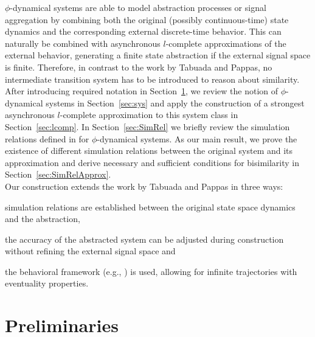 \documentclass[letterpaper, 11 pt, onecolumn]{ieeeconf}
\newcommand{\0}{\ensuremath{\emptyset}}
\newcommand{\signalmap}{\phi}
\begin{document}
$\signalmap$-dynamical systems are able to model abstraction processes or signal aggregation by combining both the original (possibly continuous-time) state dynamics and the corresponding external discrete-time behavior. This can naturally be combined with asynchronous $l$-complete approximations of the external behavior, generating a finite state abstraction if the external signal space is finite. Therefore, in contrast to the work by Tabuada and Pappas, no intermediate transition system has to be introduced to reason about similarity.\\
After introducing required notation in Section~\ref{sec:prelim}, we review the notion of $\signalmap$-dynamical systems in Section~\ref{sec:sys} and apply the construction of a strongest asynchronous $l$-complete approximation to this system class in Section~\ref{sec:lcomp}. In Section~\ref{sec:SimRel} we briefly review the simulation relations defined in \cite{SchmuckRaisch2014_HSCC} for $\signalmap$-dynamical systems. As our main result, we prove the existence of different simulation relations between the original system and its approximation and derive necessary and sufficient conditions for bisimilarity in Section~\ref{sec:SimRelApprox}.\\
Our construction extends the work by Tabuada and Pappas in three ways:
\begin{inparaenum}[(i)]
 \item simulation relations are established between the original state space dynamics and the abstraction,
 \item the accuracy of the abstracted system can be adjusted during construction without refining the external signal space and
 \item the behavioral framework (e.g., \cite{Willems1991}) is used, allowing for infinite trajectories with eventuality properties.
\end{inparaenum}







\section{Preliminaries}\label{sec:prelim}
\end{document}
